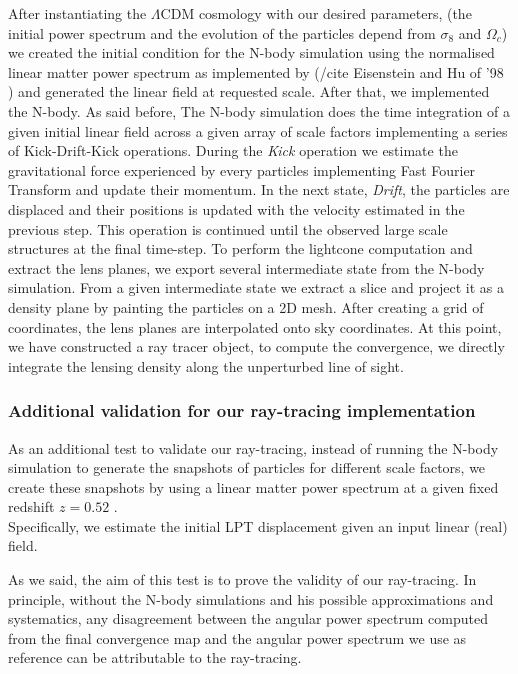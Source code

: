 \documentclass[twocolumn,twocolappendix]{aastex63}
\begin{document}
After instantiating the $\Lambda$CDM cosmology with our desired parameters, (the initial power spectrum and the evolution of the particles depend from $\sigma_8$ and $\Omega_{c}$) we created the initial condition for the N-body simulation using the normalised linear matter power spectrum as implemented by (/cite Eisenstein and Hu of '98 ) and generated the linear field at requested scale. After that, we implemented the N-body. As said before, The N-body simulation does the time integration of a given initial linear field  across a given array of scale factors implementing a series of Kick-Drift-Kick operations. 
During the \textit{Kick} operation we estimate the gravitational force experienced by every particles implementing Fast Fourier Transform and update their momentum. In the next state, \textit{Drift}, the particles are displaced and their positions is updated with the velocity estimated in the previous step. This operation is continued until the observed large scale structures at the final time-step.
To perform the lightcone computation and extract the lens planes,  we export several intermediate state from the N-body simulation. From a given intermediate state we extract a slice and project it as a density plane by painting the particles on a 2D mesh. 
After creating a grid of coordinates, the lens planes are interpolated onto sky coordinates. 
 At this point, we have constructed a ray tracer object, to compute the convergence, we directly integrate the lensing density along the unperturbed line of sight. 

    
\subsubsection{Additional validation for our ray-tracing implementation } 
As an additional test to validate our ray-tracing, instead of running the N-body simulation to generate the snapshots of particles for different scale factors, we create these snapshots by using a linear matter power spectrum at a given fixed redshift $z=0.52$ . \\
Specifically, we estimate the initial LPT displacement given an input linear (real) field.

As we said, the aim of this test is to prove the validity of our ray-tracing. In principle, without the N-body simulations and his possible approximations and systematics, any disagreement between the angular power spectrum computed from the final convergence map
and the angular power spectrum we use as reference can be attributable to the ray-tracing.
\end{document}
